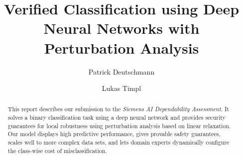 \documentclass[acmsmall,nonacm]{acmart}
\begin{document}

\title{Verified Classification using Deep Neural Networks with Perturbation Analysis}


\author{Patrick Deutschmann}

\author{Lukas Timpl}

\begin{abstract}
This report describes our submission to the \textit{Siemens AI Dependability Assessment}. It solves a binary classification task using a deep neural network and provides security guarantees for local robustness using perturbation analysis based on linear relaxation. Our model displays high predictive performance, gives provable safety guarantees, scales well to more complex data sets, and lets domain experts dynamically configure the class-wise cost of misclassification.
\end{abstract}


\maketitle

\tableofcontents
\end{document}
